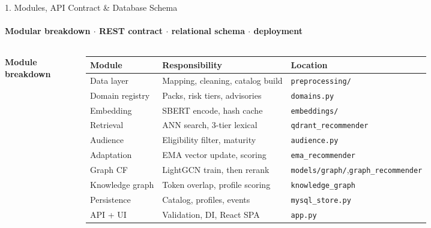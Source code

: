 \documentclass[aspectratio=169, 11pt]{beamer}
\newcommand{\eqs}{%
  \setlength{\abovedisplayskip}{3pt}%
  \setlength{\belowdisplayskip}{3pt}%
  \setlength{\abovedisplayshortskip}{2pt}%
  \setlength{\belowdisplayshortskip}{2pt}}
\newcommand{\blk}[1]{{\scriptsize\eqs\textbf{#1}}\par\vspace{0.9mm}}
\begin{document}
\begin{frame}[fragile]{1. Modules, API Contract \& Database Schema}
\framesubtitle{Modular breakdown $\cdot$ REST contract $\cdot$ relational schema $\cdot$ deployment}
\vspace{0.5mm}
\begin{columns}[T]
\blk{Module breakdown}
{\tiny
\renewcommand{\arraystretch}{1.34}
\begin{tabular}{p{1.35cm} p{1.95cm} p{2.45cm}}
\toprule
\textbf{Module} & \textbf{Responsibility} & \textbf{Location}\\
\midrule
Data layer      & Mapping, cleaning, catalog build & \texttt{preprocessing/}\\
Domain registry & Packs, risk tiers, advisories    & \texttt{domains.py}\\
Embedding       & SBERT encode, hash cache         & \texttt{embeddings/}\\
Retrieval       & ANN search, 3-tier lexical       & \texttt{qdrant\_recommender}\\
Audience        & Eligibility filter, maturity     & \texttt{audience.py}\\
Adaptation      & EMA vector update, scoring       & \texttt{ema\_recommender}\\
Graph CF        & LightGCN train, then rerank      & \texttt{models/graph/},\newline\texttt{graph\_recommender}\\
Knowledge graph & Token overlap, profile scoring   & \texttt{knowledge\_graph}\\
Persistence     & Catalog, profiles, events        & \texttt{mysql\_store.py}\\
API + UI        & Validation, DI, React SPA        & \texttt{app.py}\\
\bottomrule
\end{tabular}}


\end{columns}
\end{frame}
\end{document}
